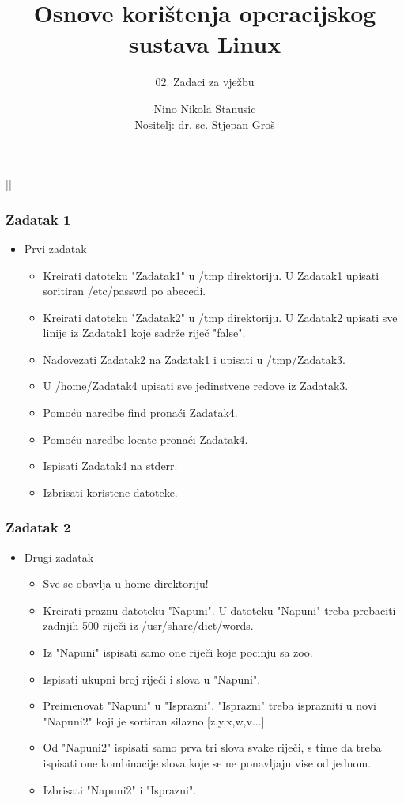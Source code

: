 \documentclass{beamer}
\title{Osnove korištenja operacijskog sustava Linux}
\subtitle{02. Zadaci za vježbu}
\author[Nino Nikola Stanusic]{Nino Nikola Stanusic\\{\small Nositelj: dr. sc. Stjepan Groš}}
\institute[FER]{Sveučilište u Zagrebu \\
				Fakultet elektrotehnike i računarstva}
\date{\todayiso}
\begin{document}
{
[] %

\begin{frame}
\maketitle
\end{frame}
}

\begin{frame}[t]
\frametitle{Zadatak 1}
\begin{itemize}
\item Prvi zadatak
\begin{itemize}
	\item Kreirati datoteku "Zadatak1" u /tmp direktoriju. U Zadatak1 upisati soritiran /etc/passwd po abecedi.
	\item Kreirati datoteku "Zadatak2" u /tmp direktoriju. U Zadatak2 upisati sve linije iz Zadatak1 koje sadrže riječ "false".
	\item Nadovezati Zadatak2 na Zadatak1 i upisati u /tmp/Zadatak3.
	\item U /home/Zadatak4 upisati sve jedinstvene redove iz Zadatak3.
	\item Pomoću naredbe find pronaći Zadatak4.
	\item Pomoću naredbe locate pronaći Zadatak4.
    \item Ispisati Zadatak4 na stderr.
    \item Izbrisati koristene datoteke.
\end{itemize}
\end{itemize}
\end{frame}

\begin{frame}[t]
\frametitle{Zadatak 2}
\begin{itemize}
\item Drugi zadatak
\begin{itemize}
	\item Sve se obavlja u home direktoriju!
	\item Kreirati praznu datoteku "Napuni". U datoteku "Napuni" treba prebaciti zadnjih 
500 riječi iz /usr/share/dict/words.
	\item Iz "Napuni" ispisati samo one riječi koje pocinju sa zoo.
	\item Ispisati ukupni broj riječi i slova u "Napuni".
	\item Preimenovat "Napuni" u "Isprazni". "Isprazni" treba isprazniti u novi "Napuni2" koji je sortiran silazno [z,y,x,w,v...].
	\item Od "Napuni2" ispisati samo prva tri slova svake riječi, s time da treba ispisati one kombinacije slova koje se ne ponavljaju vise od jednom.
	\item Izbrisati "Napuni2" i "Isprazni".
	
\end{itemize}
\end{itemize}
\end{frame}
\end{document}
